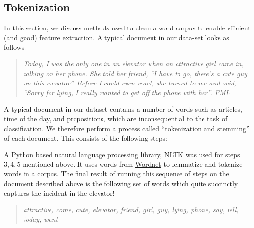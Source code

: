 \documentclass[11pt, letterpaper, conference, final, twocolumn]{ieeeconf}
\begin{document}
\subsection{Tokenization}
\label{ssec:tokenization}

In this section, we discuss methods used to clean a word corpus to enable efficient (and good) feature extraction. A typical document in our data-set looks as follows,
\begin{quote}
\small \emph{Today, I was the only one in an elevator when an attractive girl came in, talking on her phone.  She told her friend, ``I have to go, there's a cute guy on this elevator''.  Before I could even react, she turned to me and said, ``Sorry for lying, I really wanted to get off the phone with her''. FML}
\end{quote}
A typical document in our dataset contains a number of words such as articles, time of the day, and propositions, which are inconsequential to the task of classification. We therefore perform a process called ``tokenization and stemming'' of each document. This consists of the following steps:

A Python based natural language processing library, \href{http://www.nltk.org}{NLTK} was used for steps $3,4,5$ mentioned above. It uses words from \href{http://wordnet.princeton.edu}{Wordnet} to lemmatize and tokenize words in a corpus. The final result of running this sequence of steps on the document described above is the following set of words which quite succinctly captures the incident in the elevator!
\begin{quote}
\emph{attractive, come, cute, elevator, friend, girl, guy, lying, phone, say, tell, today, want}
\end{quote}
\end{document}
